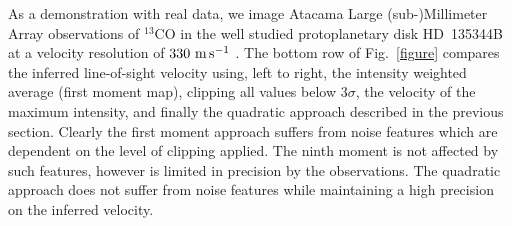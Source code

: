 \documentclass[rnaas]{aastex62}
\begin{document}
As a demonstration with real data, we image Atacama Large (sub-)Millimeter Array observations of $^{13}$CO in the well studied protoplanetary disk HD~135344B at a velocity resolution of $330~{\rm m\,s^{-1}}$ \citep[ALMA Project 2012.1.00158.S]{vanderMarel:2016} . The bottom row of Fig.~\ref{figure} compares the inferred line-of-sight velocity using, left to right, the intensity weighted average (first moment map), clipping all values below $3\sigma$, the velocity of the maximum intensity, and finally the quadratic approach described in the previous section. Clearly the first moment approach suffers from noise features which are dependent on the level of clipping applied. The ninth moment is not affected by such features, however is limited in precision by the observations. The quadratic approach does not suffer from noise features while maintaining a high precision on the inferred velocity.


\end{document}
